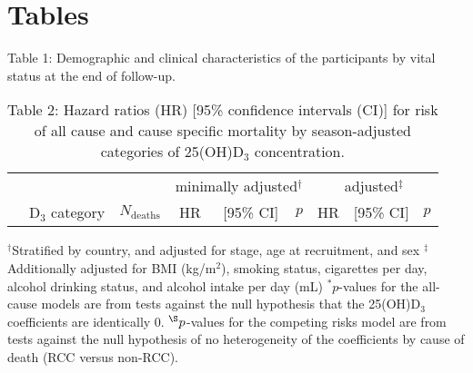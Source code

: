 \documentclass[a4paper,11pt]{article}
\begin{document}
\clearpage




\clearpage
\section*{Tables}

\begin{table}
\small
\caption{Table 1: Demographic and clinical characteristics of the participants by 
vital status at the end of follow-up.}
\centering

\end{table}

\clearpage 
\begin{table}
\caption{Table 2: Hazard ratios (HR) [95\% confidence intervals (CI)] for risk of 
all cause and cause specific mortality by season-adjusted categories of 25(OH)D$_3$ 
concentration.}
\begin{tabular}{lrrrrrrrr}
\toprule
& & &\multicolumn{3}{c}{minimally adjusted$^\dag$} & 
\multicolumn{3}{c}{adjusted$^\ddag$} \\
 \cmidrule(r){4-6} \cmidrule(l){7-9} 
& D$_3$ category & $N_{\text{deaths}}$ & HR & [95\% CI] & $p$ & HR & [95\% CI] 
& 
$p$ \\
\midrule

\bottomrule
\end{tabular}
\newline
{\footnotesize 
$^\dag$Stratified by country, and adjusted for stage, age at recruitment, and 
sex \newline
$^\ddag$Additionally adjusted for BMI (kg/m$^2$), smoking status, cigarettes 
per day, alcohol drinking status, and alcohol intake per day (mL) \newline
$^*p$-values for the all-cause models are from tests against the null 
hypothesis that the 25(OH)D$_3$ coefficients are identically 0. 
\newline
$^{\S}p$-values for the competing risks model are from tests against the null 
hypothesis of no heterogeneity of the coefficients by cause of death (RCC 
versus non-RCC).
}
\end{table}
\clearpage
\end{document}
